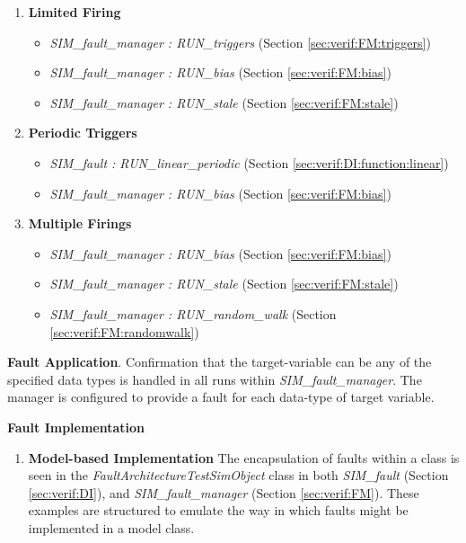 \documentclass[11pt,fleqn]{report}
\begin{document}
\begin{flushleft}
\begin{enumerate}
\begin{enumerate}
     \item \textbf{Limited Firing}
      \begin{itemize}
       \item \textit{SIM\_fault\_manager : RUN\_triggers}
         (Section \ref{sec:verif:FM:triggers})
       \item \textit{SIM\_fault\_manager : RUN\_bias}
         (Section \ref{sec:verif:FM:bias})
       \item \textit{SIM\_fault\_manager : RUN\_stale}
         (Section \ref{sec:verif:FM:stale})
      \end{itemize}
     \item \textbf{Periodic Triggers}
      \begin{itemize}
       \item \textit{SIM\_fault : RUN\_linear\_periodic}
         (Section \ref{sec:verif:DI:function:linear})
       \item \textit{SIM\_fault\_manager : RUN\_bias}
         (Section \ref{sec:verif:FM:bias})
      \end{itemize}
     \item \textbf{Multiple Firings}
      \begin{itemize}
      \item \textit{SIM\_fault\_manager : RUN\_bias}
       (Section \ref{sec:verif:FM:bias})
      \item \textit{SIM\_fault\_manager : RUN\_stale}
       (Section \ref{sec:verif:FM:stale})
      \item \textit{SIM\_fault\_manager : RUN\_random\_walk}
       (Section \ref{sec:verif:FM:randomwalk})
      \end{itemize}
    \end{enumerate} %
  \end {enumerate} %


 \item \textbf{Fault Application}. Confirmation that the target-variable can
   be any of the specified data types is handled in all runs within
   \textit{SIM\_fault\_manager}. The manager is configured to provide a fault
   for each data-type of target variable.

 \item \textbf{Fault Implementation}
  \begin{enumerate}
   \item \textbf{Model-based Implementation}
     The encapsulation of faults within a class is seen in the
     \textit{FaultArchitectureTestSimObject} class in both
     \textit{SIM\_fault} (Section \ref{sec:verif:DI}), and
     \textit{SIM\_fault\_manager} (Section \ref{sec:verif:FM}).
     These examples are structured to emulate the way in which faults
     might be implemented in a model class.


\end{enumerate}
\end{flushleft}
\end{document}
